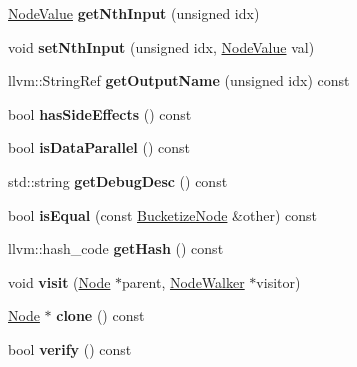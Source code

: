 \begin{DoxyCompactItemize}
\mbox{\label{classglow_1_1_bucketize_node_a4fa7a29d6b24d3cd0ad12c30f5c5d62d}} 
\hyperlink{structglow_1_1_node_value}{Node\+Value} {\bfseries get\+Nth\+Input} (unsigned idx)
\item 
\mbox{\label{classglow_1_1_bucketize_node_aeea77d3eacae709dc2994a3dd40c0525}} 
void {\bfseries set\+Nth\+Input} (unsigned idx, \hyperlink{structglow_1_1_node_value}{Node\+Value} val)
\item 
\mbox{\label{classglow_1_1_bucketize_node_a3c066db3f9cc2820ea05e7fb76b14d88}} 
llvm\+::\+String\+Ref {\bfseries get\+Output\+Name} (unsigned idx) const
\item 
\mbox{\label{classglow_1_1_bucketize_node_a6a156ab47b2bf1d733a6edc3f7a985a0}} 
bool {\bfseries has\+Side\+Effects} () const
\item 
\mbox{\label{classglow_1_1_bucketize_node_a6212e6944275f245dc80aa5e7b980a03}} 
bool {\bfseries is\+Data\+Parallel} () const
\item 
\mbox{\label{classglow_1_1_bucketize_node_a095b866c2991038b327d4999b581bfd2}} 
std\+::string {\bfseries get\+Debug\+Desc} () const
\item 
\mbox{\label{classglow_1_1_bucketize_node_ae3d589a0d6116b76e408028997a5d5c7}} 
bool {\bfseries is\+Equal} (const \hyperlink{classglow_1_1_bucketize_node}{Bucketize\+Node} \&other) const
\item 
\mbox{\label{classglow_1_1_bucketize_node_ad5a69f8a5053b072c52d951c73dda870}} 
llvm\+::hash\+\_\+code {\bfseries get\+Hash} () const
\item 
\mbox{\label{classglow_1_1_bucketize_node_a1d26f867e74f555fd0855860480f5c5e}} 
void {\bfseries visit} (\hyperlink{classglow_1_1_node}{Node} $\ast$parent, \hyperlink{classglow_1_1_node_walker}{Node\+Walker} $\ast$visitor)
\item 
\mbox{\label{classglow_1_1_bucketize_node_a732a4bfb9c59135d89b34c00721ff580}} 
\hyperlink{classglow_1_1_node}{Node} $\ast$ {\bfseries clone} () const
\item 
\mbox{\label{classglow_1_1_bucketize_node_a930ac5e00e2b15aa1add8154b2be484f}} 
bool {\bfseries verify} () const
\end{DoxyCompactItemize}
